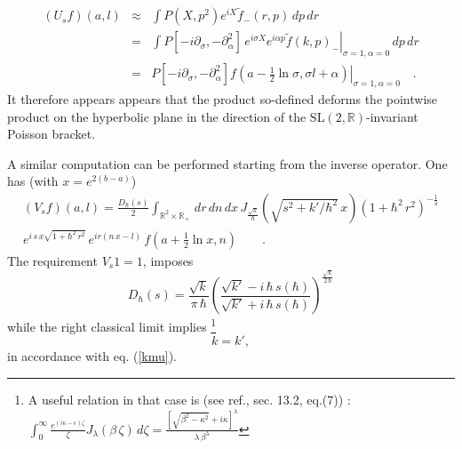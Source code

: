 \documentclass{article}
\newcommand{\R}{\mathbb R}
\newcommand{\SL}{\mbox{SL}(2,\mathbb{R})}
\newcommand{\p}{\partial}
\def \p{{\partial}}
\def \R{{\mathbb R}}
\newcommand{\re}[1]{(\ref{#1})}
\begin{document}
\begin{eqnarray}
 (U_s f)(a,l) &\approx& \int P(X,p^2) e^{i X} \tilde{f}_- (r,p)\,dp\,dr \nonumber \\
              &=& \int   P[-i \p_\sigma,-\p^2_\alpha]\, e^{i \sigma X} e^{i\alpha p}\left . \tilde{f} (k,p)_- \right \vert_{\sigma=1, \alpha=0} \,dp\,dr  \nonumber \\
              &=& P[-i \p_\sigma,-\p^2_\alpha]\left. f(a-\frac{1}{2} \ln \sigma, \sigma l + \alpha)\right\vert_{\sigma=1, \alpha=0}\quad .
\end{eqnarray}
It therefore appears appears that the product so-defined deforms the pointwise product on the hyperbolic plane in the direction of the $\SL$-invariant Poisson bracket.

\noindent A similar computation can be performed starting from the inverse operator. One has (with $x= e^{2(b-a)}$)
\begin{eqnarray}
 (V_s f)(a,l) 
  =\frac{D_\hbar (s)}{2}\int_{\R^2\times\R_+} \, dr \, dn\, dx\, J_{\frac{\sqrt{k}}{\hbar}}(\sqrt{s^2 + k'/\hbar^2} \,x) (1+\hbar^2 \,r^2)^{-\frac{1}{4}} \nonumber\\
  e^{i \,s\, x \sqrt{1+\hbar^2\, r^2}} \, e^{ i r ({n\,x} -l)} \,   f(a+\frac{1}{2}\ln x,n)\qquad.\label{Vsf}
\end{eqnarray}
The requirement $V_s 1 = 1$, imposes
\begin{equation}\label{Dnorm}
 D_\hbar (s)=\frac{\sqrt{k}}{ \pi\,\hbar}\left(\frac{\sqrt{k'}-i\,\hbar\,s(\hbar)}{\sqrt{k'}+i\,\hbar\,s(\hbar)}\right)^\frac {\sqrt{k}} {2\,\hbar} 
 \end{equation}
while the right classical limit implies \footnote{A useful relation in that case is (see ref.\cite{Wa}, sec. 13.2, eq.(7)) : $
\int_0^\infty \frac{e^{(i\kappa-\epsilon)\zeta}} \zeta J_\lambda (\beta\,\zeta)\,d\zeta=\frac{[\sqrt{\beta^2-\kappa^2}+i\kappa]^{\lambda }}{\lambda \,\beta^{\lambda }}$}
\begin{equation}\label{kmu2}
  k =  k',
\end{equation}
in accordance with eq. \re{kmu}. 
\end{document}
